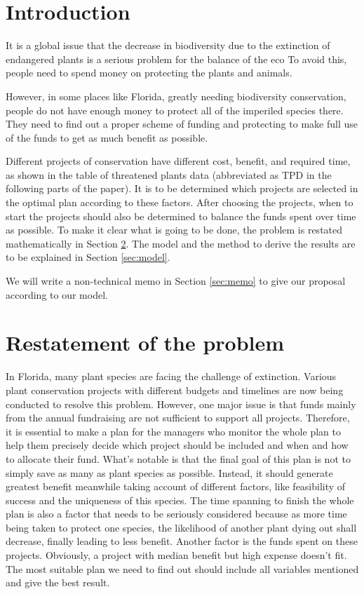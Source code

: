 \documentclass{article}
\begin{document}
\newpage
\section{Introduction}
\label{sec:intro}

It is a global issue that the decrease in biodiversity due to the extinction of endangered plants is a serious problem for the balance of the eco
To avoid this, people need to spend money on protecting the plants and animals.

However, in some places like Florida, greatly needing biodiversity conservation,
people do not have enough money to protect all of the imperiled species there.
They need to find out a proper scheme of funding and protecting to make full use of the funds to get as much benefit as possible.

Different projects of conservation have different cost, benefit, and required time,
as shown in the table of threatened plants data (abbreviated as TPD in the following parts of the paper).
It is to be determined which projects are selected in the optimal plan according to these factors.
After choosing the projects, when to start the projects should also be determined to balance the funds spent over time as possible.
To make it clear what is going to be done, the problem is restated mathematically in Section \ref{sec:restatement}.
The model and the method to derive the results are to be explained in Section \ref{sec:model}.

We will write a non-technical memo in Section \ref{sec:memo} to give our proposal according to our model.

\section{Restatement of the problem}
\label{sec:restatement}

In Florida, many plant species are facing the challenge of extinction.
Various plant conservation projects with different budgets and timelines are now being conducted to resolve this problem.
However, one major issue is that funds mainly from the annual fundraising are not sufficient to support all projects.
Therefore, it is essential to make a plan for the managers who monitor the whole plan to help them precisely decide which project should be included and when and how to allocate their fund.
What's notable is that the final goal of this plan is not to simply save as many as plant species as possible.
Instead, it should generate greatest benefit meanwhile taking account of different factors, like feasibility of success and the uniqueness of this species.
The time spanning to finish the whole plan is also a factor that needs to be seriously considered because as more time being taken to protect one species, the likelihood of another plant dying out shall decrease, finally leading to less benefit.
Another factor is the funds spent on these projects.
Obviously, a project with median benefit but high expense doesn't fit.
The most suitable plan we need to find out should include all variables mentioned and give the best result.
\end{document}
